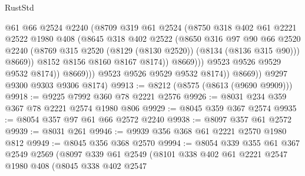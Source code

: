 \begin{lexlean}{RustStd}
\begin{coremodule}
                              @61
                              @66
                              @2524
                              @2240
                              (@8709
                                @319
                                @61
                                @2524
                                (@8750
                                  @318
                                  @402
                                  @61
                                  @2221
                                  @2522
                                  @1980
                                  @408
                                  (@8645
                                    @318
                                    @402
                                    @2522
                                    (@8650
                                      @316
                                      @97
                                      @90
                                      @66
                                      @2520
                                      @2240
                                      (@8769
                                        @315
                                        @2520
                                        (@8129 (@8130 @2520))
                                        (@8134 (@8136 @315 @90)))
                                      @8669))
                                  @8152
                                  @8156
                                  @8160
                                  @8167
                                  @8174))
                              @8669)))
                        @9523
                        @9526
                        @9529
                        @9532
                        @8174))
                    @8669)))
              @9523
              @9526
              @9529
              @9532
              @8174))
          @8669))
      @9297
      @9300
      @9303
      @9306
      @8174)
@9913 := @8212 (@8575 (@8613 (@9690 @9909)))
@9918 := @9225 @7992 @360 @78 @2221 @2576
@9926 := @8031 @234 @359 @367 @78 @2221 @2574 @1980 @806
@9929 := @8045 @359 @367 @2574
@9935 := @8054 @357 @97 @61 @66 @2572 @2240
@9938 := @8097 @357 @61 @2572
@9939 := @8031 @261
@9946 := @9939 @356 @368 @61 @2221 @2570 @1980 @812
@9949 := @8045 @356 @368 @2570
@9994 := @8054
    @339
    @355
    @61
    @367
    @2549
    @2569
    (@8097
      @339
      @61
      @2549
      (@8101
        @338
        @402
        @61
        @2221
        @2547
        @1980
        @408
        (@8045
          @338
          @402
          @2547

\end{coremodule}
\end{lexlean}
